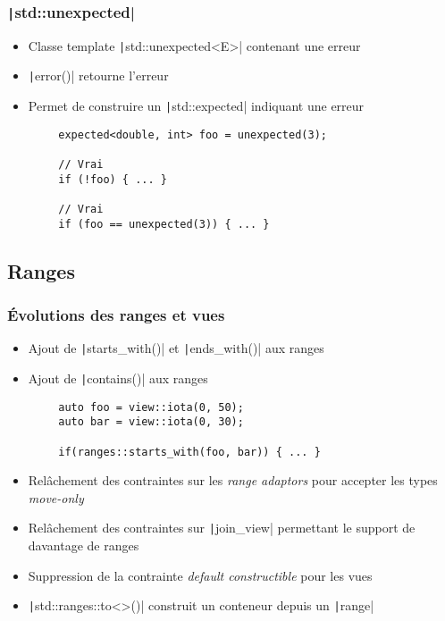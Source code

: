 \documentclass[C++.tex]{subfiles}
\begin{document}
\begin{frame}[fragile]
	\frametitle{\texttt|std::unexpected|}
	\begin{itemize}
		\item Classe template \texttt|std::unexpected<E>| contenant une erreur
		\item \texttt|error()| retourne l'erreur
		\item Permet de construire un \texttt|std::expected| indiquant une erreur
	\end{itemize}

	\begin{verbatim}
		expected<double, int> foo = unexpected(3);

		// Vrai
		if (!foo) { ... }

		// Vrai
		if (foo == unexpected(3)) { ... }
	\end{verbatim}

\end{frame}

\subsection*{Ranges}
\begin{frame}[fragile]
	\frametitle{Évolutions des ranges et vues}
	\begin{itemize}
		\item Ajout de \texttt|starts_with()| et \texttt|ends_with()| aux ranges
		\item Ajout de \texttt|contains()| aux ranges
	\end{itemize}

	\begin{verbatim}
		auto foo = view::iota(0, 50);
		auto bar = view::iota(0, 30);

		if(ranges::starts_with(foo, bar)) { ... }
	\end{verbatim}

	\begin{itemize}
		\item Relâchement des contraintes sur les \textit{range adaptors} pour accepter les types \textit{move-only}
		\item Relâchement des contraintes sur \texttt|join_view| permettant le support de davantage de ranges


		\item Suppression de la contrainte \textit{default constructible} pour les vues
		\item \texttt|std::ranges::to<>()| construit un conteneur depuis un \texttt|range|
	\end{itemize}

\end{frame}
\end{document}

